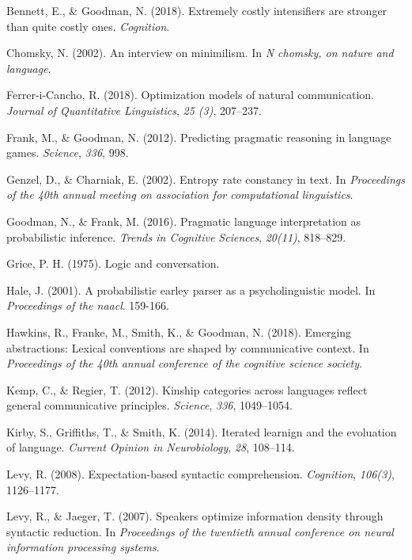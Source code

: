 \documentclass[10pt, letterpaper]{article}
\begin{document}
\hypertarget{refs}{}
\hypertarget{ref-BennettGoodman2015a}{}
Bennett, E., \& Goodman, N. (2018). Extremely costly intensifiers are
stronger than quite costly ones. \emph{Cognition}.

\hypertarget{ref-Chomsky2002a}{}
Chomsky, N. (2002). An interview on minimilism. In \emph{N chomsky, on
nature and language}.

\hypertarget{ref-FerreriCancho2018a}{}
Ferrer-i-Cancho, R. (2018). Optimization models of natural
communication. \emph{Journal of Quantitative Linguistics}, \emph{25
(3)}, 207--237.

\hypertarget{ref-FrankGoodman2012a}{}
Frank, M., \& Goodman, N. (2012). Predicting pragmatic reasoning in
language games. \emph{Science}, \emph{336}, 998.

\hypertarget{ref-GenzelCharniak2002a}{}
Genzel, D., \& Charniak, E. (2002). Entropy rate constancy in text. In
\emph{Proceedings of the 40th annual meeting on association for
computational linguistics}.

\hypertarget{ref-GoodmanFrank2016a}{}
Goodman, N., \& Frank, M. (2016). Pragmatic language interpretation as
probabilistic inference. \emph{Trends in Cognitive Sciences},
\emph{20(11)}, 818--829.

\hypertarget{ref-Grice1975a}{}
Grice, P. H. (1975). Logic and conversation.

\hypertarget{ref-Hale2001a}{}
Hale, J. (2001). A probabilistic earley parser as a psycholinguistic
model. In \emph{Proceedings of the naacl}. 159-166.

\hypertarget{ref-HawkinsFrankeSmithGoodman2018a}{}
Hawkins, R., Franke, M., Smith, K., \& Goodman, N. (2018). Emerging
abstractions: Lexical conventions are shaped by communicative context.
In \emph{Proceedings of the 40th annual conference of the cognitive
science society}.

\hypertarget{ref-KempRegier2012a}{}
Kemp, C., \& Regier, T. (2012). Kinship categories across languages
reflect general communicative principles. \emph{Science}, \emph{336},
1049--1054.

\hypertarget{ref-KirbyGriffithsSmith2014a}{}
Kirby, S., Griffiths, T., \& Smith, K. (2014). Iterated learnign and the
evoluation of language. \emph{Current Opinion in Neurobiology},
\emph{28}, 108--114.

\hypertarget{ref-Levy2008a}{}
Levy, R. (2008). Expectation-based syntactic comprehension.
\emph{Cognition}, \emph{106(3)}, 1126--1177.

\hypertarget{ref-LevyJaeger2007a}{}
Levy, R., \& Jaeger, T. (2007). Speakers optimize information density
through syntactic reduction. In \emph{Proceedings of the twentieth
annual conference on neural information processing systems}.
\end{document}

